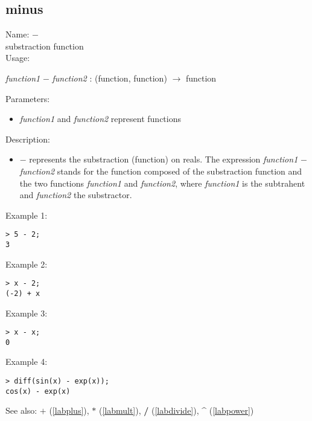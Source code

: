 \subsection{minus}
\label{labminus}
\noindent Name: \textbf{$-$}\\
substraction function\\

\noindent Usage: 
\begin{center}
\emph{function1} \textbf{$-$} \emph{function2} : (\textsf{function}, \textsf{function}) $\rightarrow$ \textsf{function}\\
\end{center}
Parameters: 
\begin{itemize}
\item \emph{function1} and \emph{function2} represent functions
\end{itemize}
\noindent Description: \begin{itemize}

\item \textbf{$-$} represents the substraction (function) on reals. 
   The expression \emph{function1} \textbf{$-$} \emph{function2} stands for
   the function composed of the substraction function and the two
   functions \emph{function1} and \emph{function2}, where \emph{function1} is 
   the subtrahent and \emph{function2} the substractor.
\end{itemize}
\noindent Example 1: 
\begin{center}\begin{minipage}{15cm}\begin{Verbatim}[frame=single]
> 5 - 2;
3
\end{Verbatim}
\end{minipage}\end{center}
\noindent Example 2: 
\begin{center}\begin{minipage}{15cm}\begin{Verbatim}[frame=single]
> x - 2;
(-2) + x
\end{Verbatim}
\end{minipage}\end{center}
\noindent Example 3: 
\begin{center}\begin{minipage}{15cm}\begin{Verbatim}[frame=single]
> x - x;
0
\end{Verbatim}
\end{minipage}\end{center}
\noindent Example 4: 
\begin{center}\begin{minipage}{15cm}\begin{Verbatim}[frame=single]
> diff(sin(x) - exp(x));
cos(x) - exp(x)
\end{Verbatim}
\end{minipage}\end{center}
See also: \textbf{$+$} (\ref{labplus}), \textbf{$*$} (\ref{labmult}), \textbf{/} (\ref{labdivide}), \textbf{\^} (\ref{labpower})
